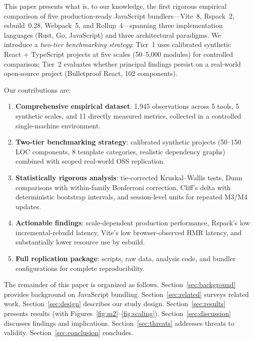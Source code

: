 \documentclass[preprint,12pt]{elsarticle}
\begin{document}
This paper presents what is, to our knowledge, the first rigorous empirical comparison of five production-ready JavaScript bundlers---Vite~8, Rspack~2, esbuild~0.28, Webpack~5, and Rollup~4---spanning three implementation languages (Rust, Go, JavaScript) and three architectural paradigms.
We introduce a \emph{two-tier benchmarking strategy}: Tier~1 uses calibrated synthetic React + TypeScript projects at five scales (50--5{,}000 modules) for controlled comparison; Tier~2 evaluates whether principal findings persist on a real-world open-source project (Bulletproof React, 102 components).

Our contributions are:
\begin{enumerate}[leftmargin=*]
  \item \textbf{Comprehensive empirical dataset}: 1{,}945 observations across 5 tools, 5 synthetic scales, and 11 directly measured metrics, collected in a controlled single-machine environment.
  \item \textbf{Two-tier benchmarking strategy}: calibrated synthetic projects (50--150 LOC components, 8 template categories, realistic dependency graphs) combined with scoped real-world OSS replication.
  \item \textbf{Statistically rigorous analysis}: tie-corrected Kruskal--Wallis tests, Dunn comparisons with within-family Bonferroni correction, Cliff's delta with deterministic bootstrap intervals, and session-level units for repeated M3/M4 updates.
  \item \textbf{Actionable findings}: scale-dependent production performance, Rspack's low incremental-rebuild latency, Vite's low browser-observed HMR latency, and substantially lower resource use by esbuild.
  \item \textbf{Full replication package}: scripts, raw data, analysis code, and bundler configurations for complete reproducibility.
\end{enumerate}

The remainder of this paper is organized as follows.
Section~\ref{sec:background} provides background on JavaScript bundling.
Section~\ref{sec:related} surveys related work.
Section~\ref{sec:design} describes our study design.
Section~\ref{sec:results} presents results (with Figures~\ref{fig:m2}--\ref{fig:scaling}).
Section~\ref{sec:discussion} discusses findings and implications.
Section~\ref{sec:threats} addresses threats to validity.
Section~\ref{sec:conclusion} concludes.

\end{document}
